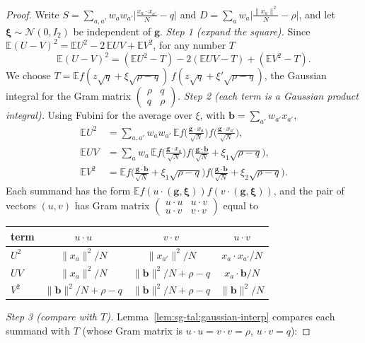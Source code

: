 \begin{proof}
\leanok
Write $S=\sum_{a,a'}w_aw_{a'}\big|\frac{x_a\cdot x_{a'}}N-q\big|$ and $D=\sum_aw_a\big|\frac{\|x_a\|^2}N-\rho\big|$, and let $\boldsymbol\xi\sim\mathcal N(0,I_2)$ be independent of $\mathbf g$.
\emph{Step 1 (expand the square).} Since $\mathbb{E}(U-V)^2=\mathbb{E}U^2-2\,\mathbb{E}UV+\mathbb{E}V^2$, for any number $T$
\[
\mathbb{E}(U-V)^2=(\mathbb{E}U^2-T)-2(\mathbb{E}UV-T)+(\mathbb{E}V^2-T).
\]
We choose $T=\mathbb{E}f(z\sqrt q+\xi\sqrt{\rho-q})\,f(z\sqrt q+\xi'\sqrt{\rho-q})$, the Gaussian integral for the Gram matrix $\left(\begin{smallmatrix}\rho&q\\q&\rho\end{smallmatrix}\right)$.
\emph{Step 2 (each term is a Gaussian product integral).} Using Fubini for the average over $\xi$, with $\mathbf b=\sum_{a'}w_{a'}x_{a'}$,
\begin{align*}
\mathbb{E}U^2&=\sum_{a,a'}w_aw_{a'}\,\mathbb{E}f\big(\tfrac{\mathbf g\cdot x_a}{\sqrt N}\big)f\big(\tfrac{\mathbf g\cdot x_{a'}}{\sqrt N}\big),\\
\mathbb{E}UV&=\sum_aw_a\,\mathbb{E}f\big(\tfrac{\mathbf g\cdot x_a}{\sqrt N}\big)f\big(\tfrac{\mathbf g\cdot\mathbf b}{\sqrt N}+\xi_1\sqrt{\rho-q}\big),\\
\mathbb{E}V^2&=\mathbb{E}f\big(\tfrac{\mathbf g\cdot\mathbf b}{\sqrt N}+\xi_1\sqrt{\rho-q}\big)f\big(\tfrac{\mathbf g\cdot\mathbf b}{\sqrt N}+\xi_2\sqrt{\rho-q}\big).
\end{align*}
Each summand has the form $\mathbb{E}f(u\cdot(\mathbf g,\boldsymbol\xi))f(v\cdot(\mathbf g,\boldsymbol\xi))$, and the pair of vectors $(u,v)$ has Gram matrix $\left(\begin{smallmatrix}u\cdot u&u\cdot v\\u\cdot v&v\cdot v\end{smallmatrix}\right)$ equal to
\begin{center}
\begin{tabular}{lccc}
term & $u\cdot u$ & $v\cdot v$ & $u\cdot v$\\ \hline
$U^2$ & $\|x_a\|^2/N$ & $\|x_{a'}\|^2/N$ & $x_a\cdot x_{a'}/N$\\
$UV$ & $\|x_a\|^2/N$ & $\|\mathbf b\|^2/N+\rho-q$ & $x_a\cdot\mathbf b/N$\\
$V^2$ & $\|\mathbf b\|^2/N+\rho-q$ & $\|\mathbf b\|^2/N+\rho-q$ & $\|\mathbf b\|^2/N$
\end{tabular}
\end{center}
\emph{Step 3 (compare with $T$).} Lemma~\ref{lem:sg-tal:gaussian-interp} compares each summand with $T$ (whose Gram matrix is $u\cdot u=v\cdot v=\rho$, $u\cdot v=q$):

\end{proof}

